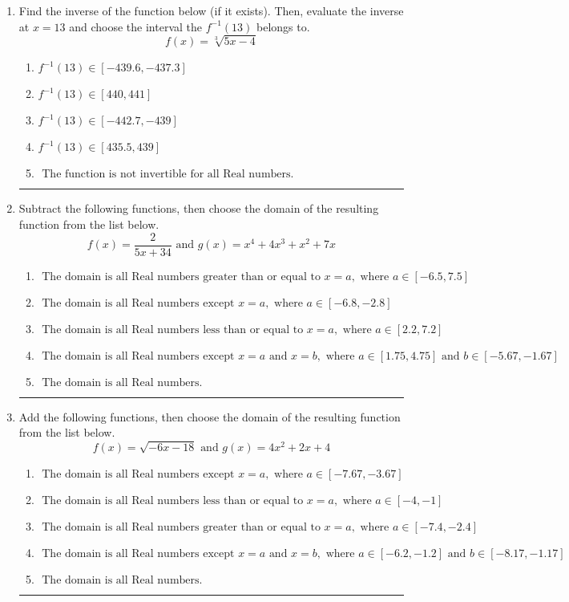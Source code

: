 \documentclass[14pt]{extbook}
\newcommand{\litem}[1]{\item#1\hspace*{-1cm}\rule{\textwidth}{0.4pt}}
\begin{document}
\begin{enumerate}
\litem{
Find the inverse of the function below (if it exists). Then, evaluate the inverse at $x = 13$ and choose the interval the $f^{-1}(13)$ belongs to.\[ f(x) = \sqrt[3]{5 x - 4} \]\begin{enumerate}[label=\Alph*.]
\item \( f^{-1}(13) \in [-439.6, -437.3] \)
\item \( f^{-1}(13) \in [440, 441] \)
\item \( f^{-1}(13) \in [-442.7, -439] \)
\item \( f^{-1}(13) \in [435.5, 439] \)
\item \( \text{ The function is not invertible for all Real numbers. } \)

\end{enumerate} }
\litem{
Subtract the following functions, then choose the domain of the resulting function from the list below.\[ f(x) = \frac{2}{5x+34} \text{ and } g(x) = x^{4} +4 x^{3} + x^{2} +7 x \]\begin{enumerate}[label=\Alph*.]
\item \( \text{ The domain is all Real numbers greater than or equal to } x = a, \text{ where } a \in [-6.5, 7.5] \)
\item \( \text{ The domain is all Real numbers except } x = a, \text{ where } a \in [-6.8, -2.8] \)
\item \( \text{ The domain is all Real numbers less than or equal to } x = a, \text{ where } a \in [2.2, 7.2] \)
\item \( \text{ The domain is all Real numbers except } x = a \text{ and } x = b, \text{ where } a \in [1.75, 4.75] \text{ and } b \in [-5.67, -1.67] \)
\item \( \text{ The domain is all Real numbers. } \)

\end{enumerate} }
\litem{
Add the following functions, then choose the domain of the resulting function from the list below.\[ f(x) = \sqrt{-6x-18}  \text{ and } g(x) = 4x^{2} +2 x + 4 \]\begin{enumerate}[label=\Alph*.]
\item \( \text{ The domain is all Real numbers except } x = a, \text{ where } a \in [-7.67, -3.67] \)
\item \( \text{ The domain is all Real numbers less than or equal to } x = a, \text{ where } a \in [-4, -1] \)
\item \( \text{ The domain is all Real numbers greater than or equal to } x = a, \text{ where } a \in [-7.4, -2.4] \)
\item \( \text{ The domain is all Real numbers except } x = a \text{ and } x = b, \text{ where } a \in [-6.2, -1.2] \text{ and } b \in [-8.17, -1.17] \)
\item \( \text{ The domain is all Real numbers. } \)


\end{enumerate}}
\end{enumerate}
\end{document}
